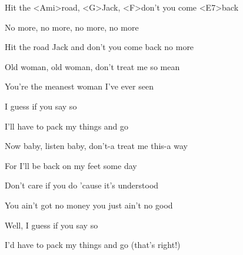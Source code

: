 
\zr
Hit the <Ami>road, <G>Jack, <F>don't you come <E7>back

No more, no more, no more, no more

Hit the road Jack and don't you come back no more

\kr
\zs

Old woman, old woman, don't treat me so mean

You're the meanest woman I've ever seen

I guess if you say so

I'll have to pack my things and go

\ks

\zr
\kr

\zs

Now baby, listen baby, don't-a treat me this-a way

For I'll be back on my feet some day

Don't care if you do 'cause it's understood

You ain't got no money you just ain't no good

Well, I guess if you say so

I'd have to pack my things and go (that's right!)

\ks

\zr
\kr

\zr
\kr

\kp
